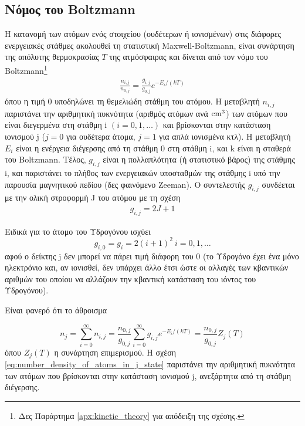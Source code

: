 \subsection{Νόμος του Boltzmann}
Η κατανομή των ατόμων ενός στοιχείου (ουδέτερων ή ιονισμένων) στις διάφορες ενεργειακές στάθμες ακολουθεί τη στατιστική Maxwell-Boltzmann, είναι συνάρτηση της απόλυτης θερμοκρασίας $T$ της ατμόσφαιρας και δίνεται από τον νόμο του Boltzmann\footnote{Δες Παράρτημα \ref{apx:kinetic_theory} για απόδειξη της σχέσης.}
\begin{eqnarray}
    \label{eq:boltmann_law}
    \frac{n_{i,j}}{n_{0,j}} = \frac{g_{i,j}}{g_{0,j}} e^{-E_i/(kT)}
\end{eqnarray}
όπου η τιμή 0 υποδηλώνει τη θεμελιώδη στάθμη του ατόμου. Η μεταβλητή $n_{i,j}$ παριστάνει την αριθμητική πυκνότητα (αριθμός ατόμων ανά $\rm cm^3$) των ατόμων που είναι διεγερμένα στη στάθμη i $(i=0,1,\dots)$ και βρίσκονται στην κατάσταση ιονισμού j ($j = 0$ για ουδέτερα άτομα, $j=1$ για απλά ιονισμένα κτλ). Η μεταβλητή $E_i$ είναι η ενέργεια διέγερσης από τη στάθμη 0 στη στάθμη i, και k είναι η σταθερά του Boltzmann. Τέλος, $g_{i,j}$ είναι η πολλαπλότητα (ή στατιστικό βάρος) της στάθμης i, και παριστάνει το πλήθος των ενεργειακών υποσταθμών της στάθμης i υπό την παρουσία μαγνητικού πεδίου (δες φαινόμενο Zeeman). Ο συντελεστής $g_{i,j}$ συνδέεται με την ολική στροφορμή J του ατόμου με τη σχέση 
\begin{eqnarray}
    \label{eq:total_angular_momentum}
    g_{i,j} = 2J + 1
\end{eqnarray}

Ειδικά για το άτομο του Υδρογόνου ισχύει $$g_{i,0} = g_i = 2(i+1)^2 \ i = 0,1,\dots$$ αφού ο δείκτης j δεν μπορεί να πάρει τιμή διάφορη του 0 (το Υδρογόνο έχει ένα μόνο ηλεκτρόνιο και, αν ιονισθεί, δεν υπάρχει άλλο έτσι ώστε οι αλλαγές των κβαντικών αριθμών του οποίου να αλλάζουν την κβαντική κατάσταση του ιόντος του Υδρογόνου).

Είναι φανερό ότι το άθροισμα

\begin{equation}
    \label{eq:number_density_of_atoms_in_j_state}
    n_j = \sum_{i=0}^{\infty} n_{i,j} = \frac{n_{0,j}}{g_{0,j}} \sum_{i=0}^{\infty} g_{i,j} e^{-E_i/(kT)} = \frac{n_{0,j}}{g_{0,j}} Z_j(T)
\end{equation}
όπου $Z_j(T)$ η συνάρτηση επιμερισμού. Η σχέση \eqref{eq:number_density_of_atoms_in_j_state} παριστάνει την αριθμητική πυκνότητα των ατόμων που βρίσκονται στην κατάσταση ιονισμού j, ανεξάρτητα από τη στάθμη διέγερσης.

